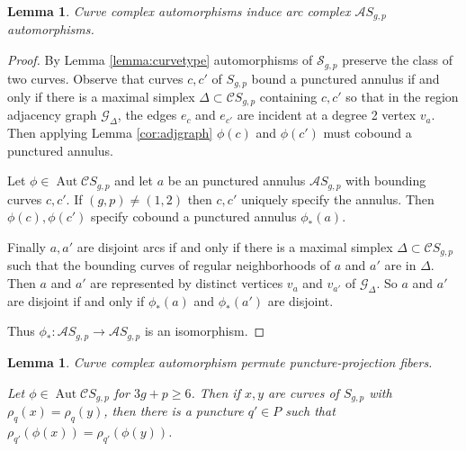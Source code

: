 \documentclass[11pt]{article}
\DeclareMathOperator{\aaut}{Aut}
\newtheorem{lemma}[theorem]{Lemma}
\theoremstyle{remark}
\theoremstyle{definition}
\begin{document}
\begin{lemma}
  Curve complex automorphisms induce
  arc complex $\mathcal A S_{g,p}$
   automorphisms.
  \label{lemma:annulus}
\end{lemma}

\begin{proof}
  By Lemma \ref{lemma:curvetype}
  automorphisms of $\mathcal S_{g,p}$
  preserve the class of two curves.
  Observe that curves $c,c'$ of $S_{g,p}$
  bound a punctured annulus if and only if there
  is a maximal simplex $\Delta \subset \mathcal C S_{g,p}$
  containing $c,c'$
  so that in the region adjacency graph $\mathcal G_\Delta$,
  the edges $e_c$ and $e_{c'}$ are incident
  at a degree 2 vertex $v_a$.
  Then applying Lemma \ref{cor:adjgraph}
  $\phi(c)$ and $\phi(c')$ must cobound a punctured annulus.

  Let $\phi \in \aaut \mathcal C S_{g,p}$
  and let $a$ be an punctured annulus $\mathcal A S_{g,p}$
  with bounding curves $c,c'$.
  If $(g,p) \neq (1,2)$ then $c,c'$ uniquely specify the annulus.
  Then $\phi(c),\phi(c')$ specify cobound a punctured annulus $\phi_\ast(a)$.

  Finally $a,a'$ are disjoint arcs if and only if
  there is a maximal simplex $\Delta \subset \mathcal C S_{g,p}$
  such that the bounding curves of regular neighborhoods of
  $a$ and $a'$
  are in $\Delta$.
  Then $a$ and $a'$ are represented by distinct
  vertices $v_a$ and $v_{a'}$ of $\mathcal G_\Delta$.
  So $a$ and $a'$ are disjoint if and only if
  $\phi_\ast (a)$ and $\phi_\ast (a')$ are disjoint.

  Thus $\phi_\ast : \mathcal A S_{g,p} \to \mathcal A S_{g,p}$
  is an isomorphism.
\end{proof}





\begin{lemma}
  Curve complex automorphism permute puncture-projection fibers.

  Let $\phi \in \aaut \mathcal C S_{g,p}$ for $3g+p \geq 6$.
  Then if $x,y$ are curves of $S_{g,p}$ with
  $\rho_q(x)=\rho_q(y)$,
  then there is a puncture $q' \in P$ such that
  $\rho_{q'}(\phi(x))=\rho_{q'}(\phi(y))$.
  \label{lemma:fibers}
\end{lemma}
\end{document}
